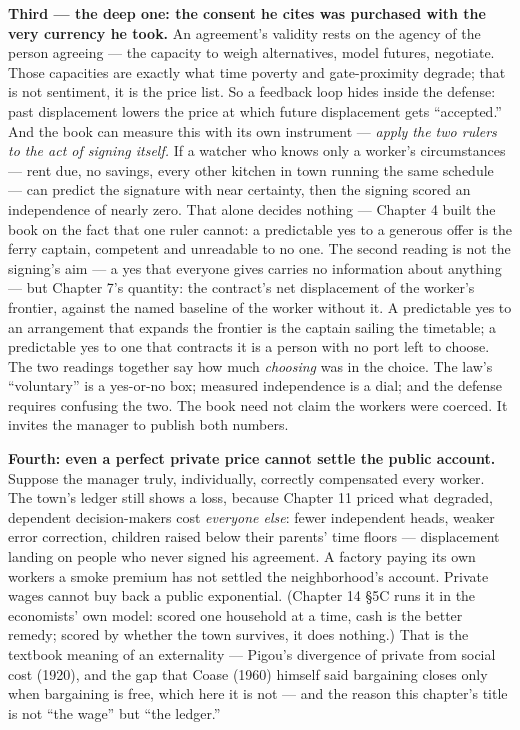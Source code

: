 \textbf{Third --- the deep one: the consent he cites was purchased with the
very currency he took.} An agreement's validity rests on the agency
of the person agreeing --- the capacity to weigh alternatives, model
futures, negotiate. Those capacities are exactly what time poverty and
gate-proximity degrade; that is not sentiment, it is the price list.
So a feedback loop hides inside the defense: past displacement lowers
the price at which future displacement gets ``accepted.'' And the book
can measure this with its own instrument --- \emph{apply the two rulers to
the act of signing itself.} If a watcher who knows only a worker's
circumstances --- rent due, no savings, every other kitchen in town
running the same schedule --- can predict the signature with near
certainty, then the signing scored an independence of nearly zero.
That alone decides nothing --- Chapter 4 built the book on the fact that
one ruler cannot: a predictable yes to a generous offer is the ferry
captain, competent and unreadable to no one. The second reading is not
the signing's aim --- a yes that everyone gives carries no information
about anything --- but Chapter 7's quantity: the
contract's net displacement of the worker's frontier, against the
named baseline of the worker without it. A predictable yes to an
arrangement that expands the frontier is the captain sailing the
timetable; a predictable yes to one that contracts it is a person with
no port left to choose. The two readings together say how much
\emph{choosing} was in the choice. The law's ``voluntary'' is a yes-or-no
box; measured independence is a dial; and the defense requires
confusing the two. The book need not claim the workers were coerced.
It invites the manager to publish both numbers.

\textbf{Fourth: even a perfect private price cannot settle the public
account.} Suppose the manager truly, individually, correctly
compensated every worker. The town's ledger still shows a loss,
because Chapter 11 priced what degraded, dependent decision-makers
cost \emph{everyone else}: fewer independent heads, weaker error
correction, children raised below their parents' time floors ---
displacement landing on people who never signed his agreement. A
factory paying its own workers a smoke premium has not settled the
neighborhood's account. Private wages cannot buy back a public
exponential. (Chapter 14 §5C runs it in the economists' own model:
scored one household at a time, cash is the better remedy; scored by
whether the town survives, it does nothing.) That is the textbook meaning of an externality --- Pigou's divergence of private from social cost (1920), and the gap that Coase (1960) himself said bargaining closes only when bargaining is free, which here it is not --- and the
reason this chapter's title is not ``the wage'' but ``the ledger.''

